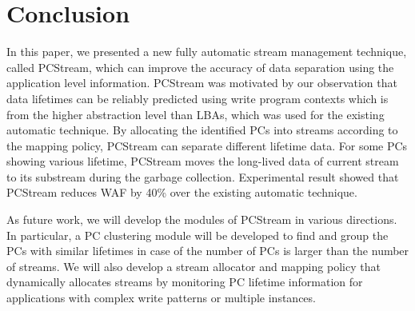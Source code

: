 \section{Conclusion}
In this paper, we presented a new fully automatic stream management technique,
called {\sf PCStream}, which can improve the accuracy of data separation
using the application level information.
{\sf PCStream} was motivated by our observation that data lifetimes can be
reliably predicted using write program contexts which is from the higher
abstraction level than LBAs, which was used for the existing automatic technique.
By allocating the identified PCs into streams according to the mapping policy,
{\sf PCStream} can separate different lifetime data. 
For some PCs showing various lifetime, {\sf PCStream} moves the long-lived data of 
current stream to its substream during the garbage collection.
Experimental result showed that {\sf PCStream} reduces WAF by 40\% over the existing
automatic technique.

As future work, we will develop the modules of {\sf PCStream} in various directions. 
In particular, a PC clustering module will be developed to find and group the PCs with similar lifetimes
in case of the number of PCs is larger than the number of streams.
We will also develop a stream allocator and mapping policy that dynamically allocates 
streams by monitoring PC lifetime information for 
applications with complex write patterns or multiple instances.

